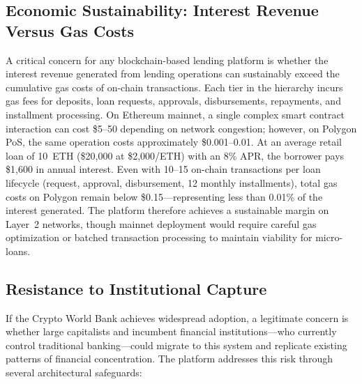 \documentclass[12pt,a4paper]{report}
\begin{document}
\subsection{Economic Sustainability: Interest Revenue Versus Gas Costs}

A critical concern for any blockchain-based lending platform is whether the interest revenue generated from lending operations can sustainably exceed the cumulative gas costs of on-chain transactions. Each tier in the hierarchy incurs gas fees for deposits, loan requests, approvals, disbursements, repayments, and installment processing. On Ethereum mainnet, a single complex smart contract interaction can cost \$5--50 depending on network congestion; however, on Polygon PoS, the same operation costs approximately \$0.001--0.01. At an average retail loan of 10~ETH (\$20,000 at \$2,000/ETH) with an 8\% APR, the borrower pays \$1,600 in annual interest. Even with 10--15 on-chain transactions per loan lifecycle (request, approval, disbursement, 12 monthly installments), total gas costs on Polygon remain below \$0.15---representing less than 0.01\% of the interest generated. The platform therefore achieves a sustainable margin on Layer~2 networks, though mainnet deployment would require careful gas optimization or batched transaction processing to maintain viability for micro-loans.

\subsection{Resistance to Institutional Capture}

If the Crypto World Bank achieves widespread adoption, a legitimate concern is whether large capitalists and incumbent financial institutions---who currently control traditional banking---could migrate to this system and replicate existing patterns of financial concentration. The platform addresses this risk through several architectural safeguards:
\end{document}
